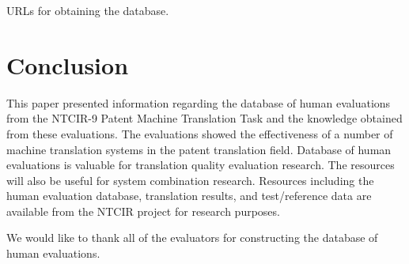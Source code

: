 \documentclass[english]{jnlp_1.4}
\begin{document}
\begin{table}[b]
\caption{URLs for obtaining the database.}

\end{table}



\section{Conclusion}
\label{sec:conclusion}

This paper presented information regarding the database of human evaluations from the NTCIR-9 Patent Machine Translation Task and the knowledge obtained from these evaluations. 
The evaluations showed the effectiveness of a number of machine translation systems in the patent translation field. 
Database of human evaluations is valuable for translation quality evaluation research. 
The resources will also be useful for system combination research. 
Resources including the human evaluation database, translation results, and test/reference data are available from the NTCIR project for research purposes.



\acknowledgment

We would like to thank all of the evaluators for constructing the database of human evaluations. 
\end{document}
